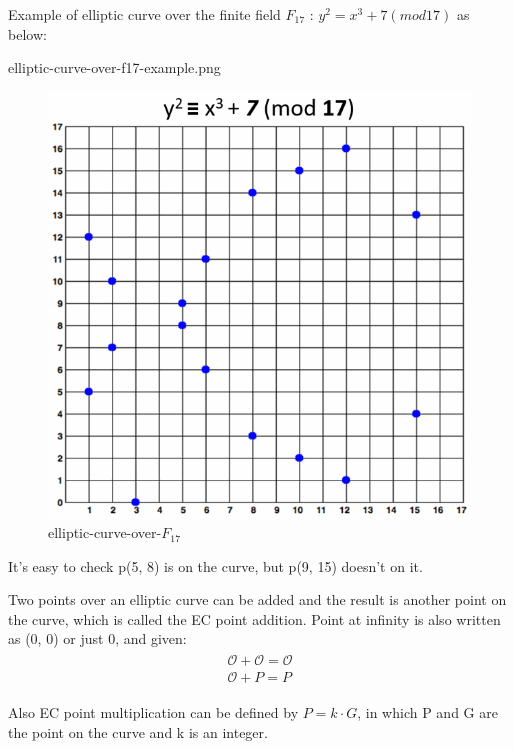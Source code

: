 \documentclass[a4paper,11pt]{article}
\begin{document}
Example of elliptic curve over the finite field $F_{17}$ : $y^2 = x^3 + 7 (mod 17)$ as below:

elliptic-curve-over-f17-example.png
\begin{figure}[H]
\centering
\includegraphics[scale=0.5]{./images/elliptic-curve-over-f17-example.png}
\caption{elliptic-curve-over-$F_{17}$}
\end{figure}

It's easy to check p(5, 8) is on the curve, but p(9, 15) doesn't on it.

Two points over an elliptic curve can be added and the result is another point on the curve, which is called the EC point addition.  Point at infinity is also written as (0, 0) or just 0,  and given:
\begin{equation}
\begin{split}
{\displaystyle {\begin{aligned}{\mathcal {O}}+{\mathcal {O}}={\mathcal {O}}\\{\mathcal {O}}+P=P\end{aligned}}}
\end{split}
\end{equation}


Also EC point multiplication can be defined by $P = k \cdot G$, in which P and G are the point on the curve and k is an integer.
\end{document}
